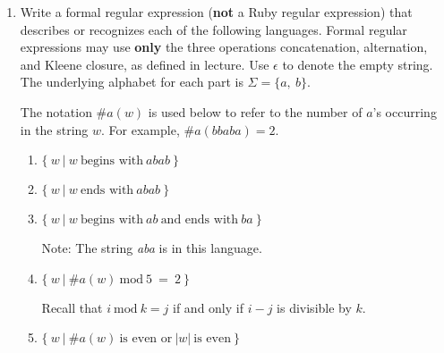 \documentclass[11pt]{article}
\begin{document}
\begin{enumerate}
\begin{multicols}{3}
\begin{enumerate}
           \end{enumerate}

          \end{multicols}

    \item Write a formal regular expression (\textbf{not} a Ruby regular
          expression) that describes or recognizes each of the following
          languages.  Formal regular expressions may use \textbf{only} the
          three operations concatenation, alternation, and Kleene closure,
          as defined in lecture.  Use $\epsilon$ to denote the empty string.
          The underlying alphabet for each part is $\Sigma = \{a, \: b\}$.

          The notation $\#a(w)$ is used below to refer to the number of $a$'s
          occurring in the string $w$.  For example, $\#a(bbaba) = 2$.

          \vspace{-1mm}

          \begin{multicols}{2}

            \begin{enumerate}

              \addtolength{\itemsep}{2mm}

              \item $ \{ \: w\ | \ w \ \textrm{begins with} \ abab\: \} $

              \item $ \{ \: w\ | \ w \ \textrm{ends with} \ abab\: \} $

              \item $ \{ \: w\ | \ w \ \textrm{begins with} \ ab \
                      \textrm{and ends with} \ ba\: \} $

                    \smallskip

                    Note: The string \textit{aba\/} is in this language.

              \item $ \{ \: w\ | \ \#a(w) \ \mathrm{mod} \ 5 \:
                      = \: 2 \: \}$

                    \smallskip

                    Recall that $i \ \mathrm{mod} \ k = j$ if and only if
                    $i - j$ is divisible by $k$.

                    \columnbreak

              \item $ \{ \: w\ | \ \#a(w) \ \textrm{is even or} \
                      |w| \ \textrm{is even} \: \} $


\end{enumerate}
\end{multicols}
\end{enumerate}
\end{document}
